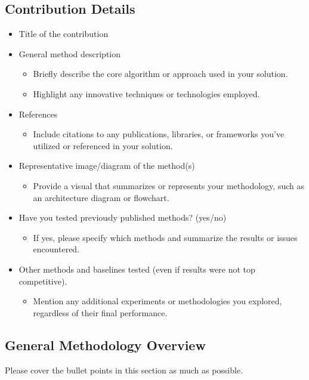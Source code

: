 \documentclass{article}
\begin{document}
\subsection{Contribution Details}

\begin{itemize}
    \item Title of the contribution
    \item General method description
        \begin{itemize}
            \item Briefly describe the core algorithm or approach used in your solution.
            \item Highlight any innovative techniques or technologies employed.
        \end{itemize}
    \item References
        \begin{itemize}
            \item Include citations to any publications, libraries, or frameworks you've utilized or referenced in your solution.
        \end{itemize}
    \item Representative image/diagram of the method(s)
        \begin{itemize}
            \item Provide a visual that summarizes or represents your methodology, such as an architecture diagram or flowchart.
        \end{itemize}
    \item Have you tested previously published methods? (yes/no)
        \begin{itemize}
            \item If yes, please specify which methods and summarize the results or issues encountered.
        \end{itemize}
    \item Other methods and baselines tested (even if results were not top competitive).
        \begin{itemize}
            \item Mention any additional experiments or methodologies you explored, regardless of their final performance.
        \end{itemize}
\end{itemize}


\subsection{General Methodology Overview}
Please cover the bullet points in this section as much as possible.
\end{document}
